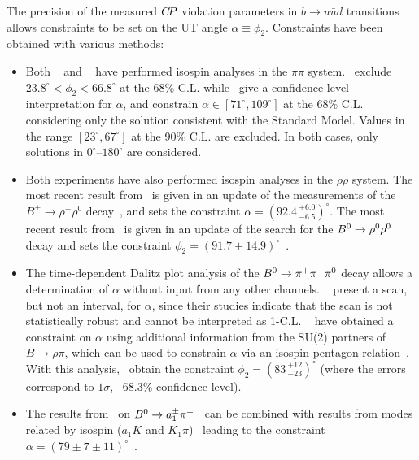 The precision of the measured $C\!P$ violation parameters in
$b \to u\bar{u}d$ transitions allows 
constraints to be set on the UT angle $\alpha \equiv \phi_2$. 
Constraints have been obtained with various methods:
\begin{itemize}\setlength{\itemsep}{0.5ex}
\item 
  Both \babar~\cite{Lees:2012mma}
  and  \belle~\cite{Adachi:2013mae} have performed 
  isospin analyses in the $\pi\pi$ system.
  \belle\ exclude $23.8^\circ < \phi_2 < 66.8^\circ$ at the 68\%  C.L. while
  \babar\ give a confidence level interpretation for $\alpha$, and constrain
  $\alpha \in \left[ 71^\circ, 109^\circ \right]$ at the 68\%
  C.L. considering only the solution consistent with the Standard Model.
  Values in the range $\left[ 23^\circ, 67^\circ \right]$ at the 90\% C.L. are
  excluded.
  In both cases, only solutions in $0^\circ$--$180^\circ$ are considered.

\item
  Both experiments have also performed isospin analyses in the $\rho\rho$
  system. 
  The most recent result from \babar\ is given in an update of the
  measurements of the $B^+\to\rho^+\rho^0$ decay~\cite{Aubert:2009it}, and
  sets the constraint $\alpha = \left( 92.4 \,^{+6.0}_{-6.5}\right)^\circ$.
  The most recent result from \belle\ is given in an update of the
  search for the $B^0 \to \rho^0\rho^0$ decay and sets the constraint
  $\phi_2 = \left( 91.7 \pm 14.9 \right)^\circ$~\cite{:2008et}.

\item
  The time-dependent Dalitz plot analysis of the $B^0 \to \pi^+\pi^-\pi^0$
  decay allows a determination of $\alpha$ without input from any other 
  channels.
  \babar~\cite{Lees:2013nwa} present a scan, but not an interval, for $\alpha$, since
  their studies indicate that the scan is not statistically robust and cannot
  be interpreted as 1-C.L. 
  \belle~\cite{Kusaka:2007dv,:2007mj} have obtained a constraint on $\alpha$
  using additional information from the SU(2) partners of 
  $B \to \rho\pi$, which can be used to constrain $\alpha$
  via an isospin pentagon relation~\cite{Lipkin:1991st}. 
  With this analysis,
  \belle\ obtain the constraint $\phi_2 = (83 \, ^{+12}_{-23})^\circ$
  (where the errors correspond to $1\sigma$, \ie\ $68.3\%$ confidence level).

\item 
  The results from \babar\ on $B^0 \to a_1^\pm \pi^\mp$~\cite{Aubert:2006gb} can be
  combined with results from modes related by isospin ($a_1K$ and $K_1\pi$)~\cite{Gronau:2005kw}
  leading to the constraint
  $\alpha = \left( 79 \pm 7 \pm 11 \right)^\circ$~\cite{:2009ii}.


\end{itemize}
